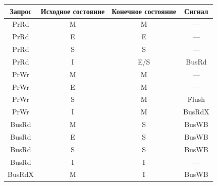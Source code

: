 \begin{table}[b]\small


\vspace*{-6pt}


\begin{center}


\parbox{292pt}{





}





\vspace*{2ex}





\begin{tabular}{|c|c|c|c|}


\hline


Запрос&Исходное состояние &Конечное состояние&Сигнал\\


\hline


PrRd&M&M&---\\


PrRd&E&E&---\\


PrRd&S&S&---\\


PrRd


&I&E/S&BusRd\\


PrWr&M&M&---\\


PrWr&E&M&---\\


PrWr&S&M&Flush\\


PrWr


&I&M&BusRdX\\


BusRd&M&S&BusWB\\


BusRd&E&S&BusWB\\


BusRd&S&S&BusWB\\


BusRd


&I&I&---\\


BusRdX&M&I&BusWB\\



\end{tabular}
\end{center}
\end{table}
